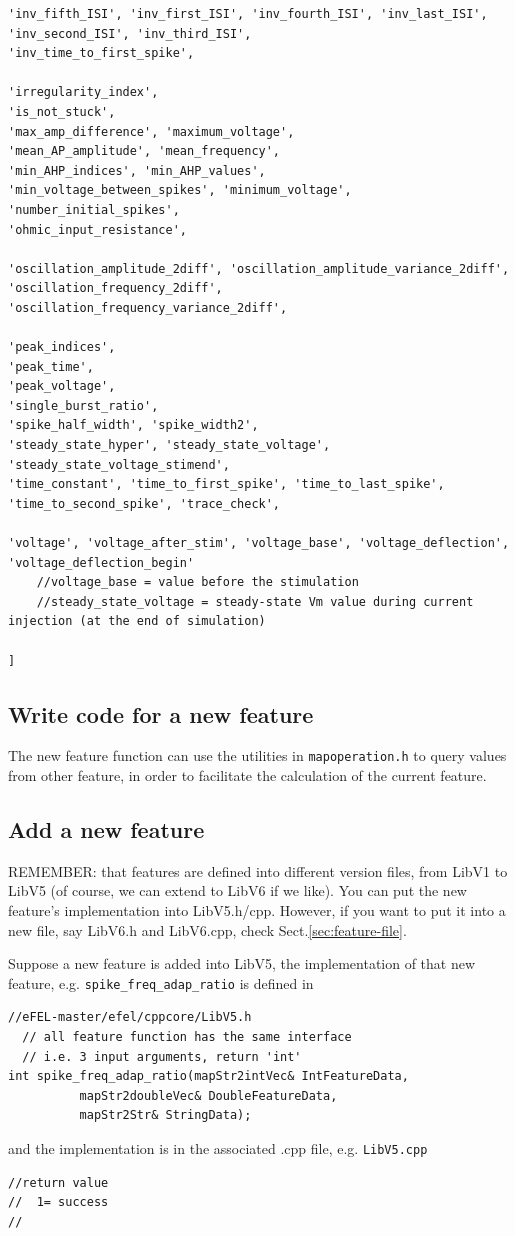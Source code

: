 {\begin{verbatim}
'inv_fifth_ISI', 'inv_first_ISI', 'inv_fourth_ISI', 'inv_last_ISI', 'inv_second_ISI', 'inv_third_ISI', 
'inv_time_to_first_spike',

'irregularity_index',
'is_not_stuck',
'max_amp_difference', 'maximum_voltage',
'mean_AP_amplitude', 'mean_frequency',
'min_AHP_indices', 'min_AHP_values',
'min_voltage_between_spikes', 'minimum_voltage', 'number_initial_spikes',
'ohmic_input_resistance',

'oscillation_amplitude_2diff', 'oscillation_amplitude_variance_2diff', 'oscillation_frequency_2diff', 
'oscillation_frequency_variance_2diff',

'peak_indices',
'peak_time',
'peak_voltage',
'single_burst_ratio',
'spike_half_width', 'spike_width2',
'steady_state_hyper', 'steady_state_voltage', 'steady_state_voltage_stimend',
'time_constant', 'time_to_first_spike', 'time_to_last_spike', 'time_to_second_spike', 'trace_check',

'voltage', 'voltage_after_stim', 'voltage_base', 'voltage_deflection', 'voltage_deflection_begin'
	//voltage_base = value before the stimulation
	//steady_state_voltage = steady-state Vm value during current injection (at the end of simulation)

]
\end{verbatim}
}


\subsection{Write code for a new feature}

The new feature function can use the utilities in \verb!mapoperation.h! to query
values from other feature, in order to facilitate the calculation of the current
feature. 


\subsection{Add a new feature}

REMEMBER: that features are defined into different version files, from LibV1 to
LibV5 (of course, we can extend to LibV6 if we like). 
You can put the new feature's implementation into LibV5.h/cpp. However, if you
want to put it into a new file, say LibV6.h and LibV6.cpp, check
Sect.\ref{sec:feature-file}.

Suppose a new feature is added into LibV5, the implementation of that new
feature, e.g. \verb!spike_freq_adap_ratio! is defined in
\begin{verbatim}
//eFEL-master/efel/cppcore/LibV5.h
  // all feature function has the same interface 
  // i.e. 3 input arguments, return 'int'
int spike_freq_adap_ratio(mapStr2intVec& IntFeatureData,
          mapStr2doubleVec& DoubleFeatureData,
          mapStr2Str& StringData);
\end{verbatim}
and the implementation is in the associated .cpp file, e.g. \verb!LibV5.cpp!
\begin{verbatim}
//return value
//  1= success
//
\end{verbatim}

